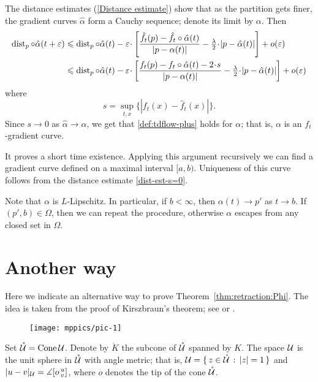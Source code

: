 \documentclass[oneside,a4paper, 12pt]{article}
\begin{document}
The distance estimates (\ref{Distance estimate}) show that as the partition gets finer, the gradient curves $\hat\alpha$ form a Cauchy sequence; denote its limit by $\alpha$.
Then
\begin{align*}
\dist_p\circ\hat\alpha(t+\eps)
&\le 
\dist_p\circ\hat\alpha(t)
-\eps\cdot \left[\frac{\hat f_t(p)-\hat f_t\circ\hat\alpha(t)}{|p-\alpha(t)|}-\tfrac\lambda2\cdot |p-\hat\alpha(t)|\right]
+o(\eps)
\\
&\le 
\dist_p\circ\hat\alpha(t)
-\eps\cdot \left[\frac{f_t(p)-f_t\circ\hat\alpha(t)-2\cdot s}{|p-\alpha(t)|}-\tfrac\lambda2\cdot |p-\hat\alpha(t)|\right]
+o(\eps)
\end{align*}
where 
\[s=\sup_{t,x} \{|f_t(x)-\hat f_t(x)|\}.\]
Since $s\to 0$ as $\hat\alpha\to \alpha$, we get that \ref{def:tdflow-plus} holds for $\alpha$;
that is, $\alpha$ is an $f_t$-gradient curve.

It proves a short time existence.
Applying this argument recursively we can find a gradient curve defined on a maximal interval $[a,b)$.
Uniqueness of this curve follows from the distance estimate \ref{dist-est-s=0}. 

Note that $\alpha$ is $L$-Lipschitz.
In particular, if $b<\infty$, then $\alpha(t)\to p'$ as $t\to b$.
If $(p',b)\in \Omega$, then we can repeat the procedure, otherwise $\alpha$ escapes from any closed set in $\Omega$. 
\qeds

\section{Another way}\label{Another way}

Here we indicate an alternative way to prove Theorem~\ref{thm:retraction:Phi}.
The idea is taken from the proof of Kirszbraun's theorem; see \cite[5.1]{akp-kirszbraun} or \cite[9.4.1]{akp}. %

\begin{wrapfigure}{o}{55 mm}
\centering
\texttt{[image: mppics/pic-1]}
\end{wrapfigure}

Set $\mathring{\mathcal{U}}=\mathop{\rm Cone}\nolimits \mathcal{U}$.
Denote by $\mathring{K}$ the subcone of $\mathring{\mathcal{U}}$ spanned by $K$.
The space $\mathcal{U}$ is the unit sphere in $\mathring{\mathcal{U}}$ with angle metric;
that is, $\mathcal{U}=\{\,{z\in \mathring{\mathcal{U}}}\,:\,{|z|=1}\,\}$ and $|u-v|_{\mathcal{U}}=\measuredangle[o\,{}^u_v]$, where $o$ denotes the tip of the cone $\mathring{\mathcal{U}}$.
\end{document}
